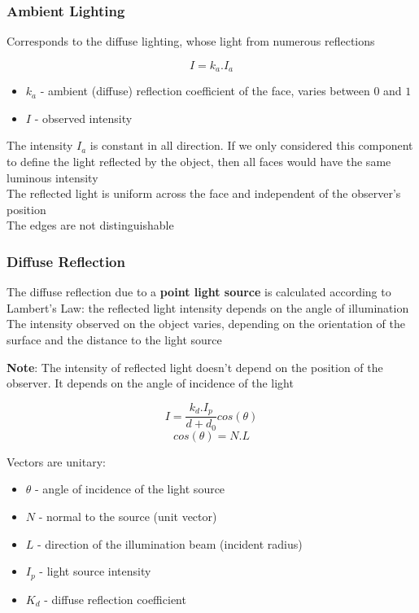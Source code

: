 \documentclass[a4paper]{article}
\begin{document}
\begin{flushleft}
\subsubsection{Ambient Lighting}
Corresponds to the diffuse lighting, whose light from numerous reflections

\begin{equation}
	I = k_a.I_a
\end{equation}
\begin{itemize}
	\item $k_a$ - ambient (diffuse) reflection coefficient of the face, varies between $0$ and $1$
	\item $I$ - observed intensity
\end{itemize}
The intensity $I_a$ is constant in all direction. If we only considered this component to define the light reflected by the object, then all faces would have the same luminous intensity\\
The reflected light is uniform across the face and independent of the observer's position\\
The edges are not distinguishable

\subsubsection{Diffuse Reflection}
The diffuse reflection due to a \textbf{point light source} is calculated according to Lambert's Law: the reflected light intensity depends on the angle of illumination\\
The intensity observed on the object varies, depending on the orientation of the surface and the distance to the light source

\textbf{Note}: The intensity of reflected light doesn't depend on the position of the observer. It depends on the angle of incidence of the light

\begin{equation}
	I = \frac{k_d.I_p}{d+d_0}cos(\theta)
\end{equation}
\begin{equation}
	cos(\theta) = N.L
\end{equation}

Vectors are unitary:
\begin{itemize}
	\item $\theta$ - angle of incidence of the light source
	\item $N$ - normal to the source (unit vector)
	\item $L$ - direction of the illumination beam (incident radius)
	\item $I_p$ - light source intensity
	\item $K_d$ - diffuse reflection coefficient
\end{itemize}


\end{flushleft}
\end{document}
